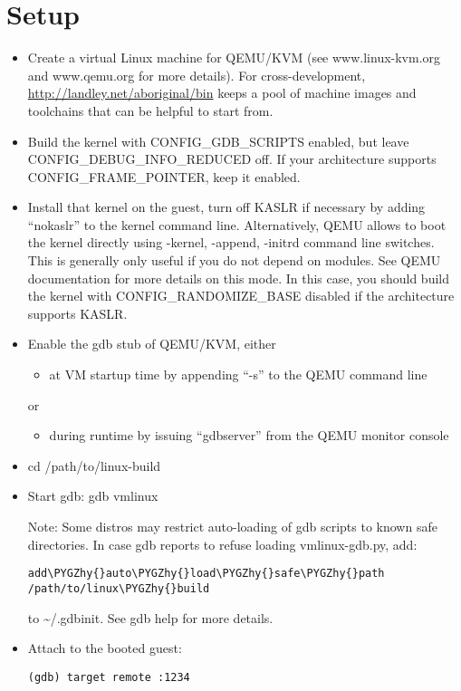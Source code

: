 \documentclass[a4paper,8pt,english]{sphinxmanual}
\def\PYGZhy{\char`\-}
\begin{document}
\section{Setup}
\label{dev-tools/gdb-kernel-debugging:setup}\begin{itemize}
\item {} 
Create a virtual Linux machine for QEMU/KVM (see www.linux-kvm.org and
www.qemu.org for more details). For cross-development,
\url{http://landley.net/aboriginal/bin} keeps a pool of machine images and
toolchains that can be helpful to start from.

\item {} 
Build the kernel with CONFIG\_GDB\_SCRIPTS enabled, but leave
CONFIG\_DEBUG\_INFO\_REDUCED off. If your architecture supports
CONFIG\_FRAME\_POINTER, keep it enabled.

\item {} 
Install that kernel on the guest, turn off KASLR if necessary by adding
``nokaslr'' to the kernel command line.
Alternatively, QEMU allows to boot the kernel directly using -kernel,
-append, -initrd command line switches. This is generally only useful if
you do not depend on modules. See QEMU documentation for more details on
this mode. In this case, you should build the kernel with
CONFIG\_RANDOMIZE\_BASE disabled if the architecture supports KASLR.

\item {} 
Enable the gdb stub of QEMU/KVM, either
\begin{itemize}
\item {} 
at VM startup time by appending ``-s'' to the QEMU command line

\end{itemize}

or
\begin{itemize}
\item {} 
during runtime by issuing ``gdbserver'' from the QEMU monitor
console

\end{itemize}

\item {} 
cd /path/to/linux-build

\item {} 
Start gdb: gdb vmlinux

Note: Some distros may restrict auto-loading of gdb scripts to known safe
directories. In case gdb reports to refuse loading vmlinux-gdb.py, add:

\begin{Verbatim}[commandchars=\\\{\}]
add\PYGZhy{}auto\PYGZhy{}load\PYGZhy{}safe\PYGZhy{}path /path/to/linux\PYGZhy{}build
\end{Verbatim}

to \textasciitilde{}/.gdbinit. See gdb help for more details.

\item {} 
Attach to the booted guest:

\begin{Verbatim}[commandchars=\\\{\}]
(gdb) target remote :1234
\end{Verbatim}

\end{itemize}
\end{document}

